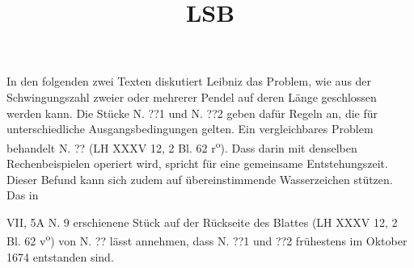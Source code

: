 \vspace*{8mm}
\pstart 
\normalsize
\noindent In den folgenden zwei Texten diskutiert Leibniz das Problem, wie aus der Schwingungszahl zweier oder mehrerer Pendel auf deren L\"{a}nge geschlossen werden kann. Die St\"{u}cke N. ??1 und N. ??2 geben daf\"{u}r Regeln an, die f\"{u}r unter\-schiedliche Ausgangsbedingungen gelten. Ein vergleichba\-res Problem behandelt N. ?? (LH XXXV 12, 2 Bl. 62 r\textsuperscript{o}). Dass darin mit denselben Rechenbeispielen operiert wird, spricht f\"{u}r eine gemeinsame Entstehungszeit. Dieser Befund kann sich zudem auf \"{u}bereinstimmende Wasserzeichen  st\"{u}tzen. Das in \cite{00115}\title{LSB} VII, 5A N. 9 erschienene St\"{u}ck auf der R\"{u}ckseite des Blattes (LH XXXV 12, 2 Bl. 62 v\textsuperscript{o}) von N. ?? l\"{a}sst annehmen, dass N. ??1 und ??2 fr\"{u}hestens im Oktober 1674 entstanden sind.\pend
 

